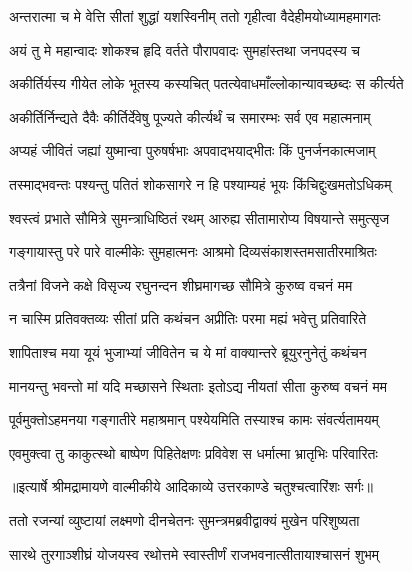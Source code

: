 \twolineshloka
{अन्तरात्मा च मे वेत्ति सीतां शुद्धां यशस्विनीम्}
{ततो गृहीत्वा वैदेहीमयोध्यामहमागतः} %

\twolineshloka
{अयं तु मे महान्वादः शोकश्च हृदि वर्तते}
{पौरापवादः सुमहांस्तथा जनपदस्य च} %

\twolineshloka
{अकीर्तिर्यस्य गीयेत लोके भूतस्य कस्यचित्}
{पतत्येवाधमाँल्लोकान्यावच्छब्दः स कीर्त्यते} %

\twolineshloka
{अकीर्तिर्निन्द्यते दैवैः कीर्तिर्देवेषु पूज्यते}
{कीर्त्यर्थं च समारम्भः सर्व एव महात्मनाम्} %

\twolineshloka
{अप्यहं जीवितं जह्यां युष्मान्वा पुरुषर्षभाः}
{अपवादभयाद्भीतः किं पुनर्जनकात्मजाम्} %

\twolineshloka
{तस्माद्भवन्तः पश्यन्तु पतितं शोकसागरे}
{न हि पश्याम्यहं भूयः किंचिद्दुःखमतोऽधिकम्} %

\twolineshloka
{श्वस्त्वं प्रभाते सौमित्रे सुमन्त्राधिष्ठितं रथम्}
{आरुह्य सीतामारोप्य विषयान्ते समुत्सृज} %

\twolineshloka
{गङ्गायास्तु परे पारे वाल्मीकेः सुमहात्मनः}
{आश्रमो दिव्यसंकाशस्तमसातीरमाश्रितः} %

\twolineshloka
{तत्रैनां विजने कक्षे विसृज्य रघुनन्दन}
{शीघ्रमागच्छ सौमित्रे कुरुष्व वचनं मम} %

\twolineshloka
{न चास्मि प्रतिवक्तव्यः सीतां प्रति कथंचन}
{अप्रीतिः परमा मह्यं भवेत्तु प्रतिवारिते} %

\twolineshloka
{शापिताश्च मया यूयं भुजाभ्यां जीवितेन च}
{ये मां वाक्यान्तरे ब्रूयुरनुनेतुं कथंचन} %

\twolineshloka
{मानयन्तु भवन्तो मां यदि मच्छासने स्थिताः}
{इतोऽद्य नीयतां सीता कुरुष्व वचनं मम} %

\twolineshloka
{पूर्वमुक्तोऽहमनया गङ्गातीरे महाश्रमान्}
{पश्येयमिति तस्याश्च कामः संवर्त्यतामयम्} %

\twolineshloka
{एवमुक्त्वा तु काकुत्स्थो बाष्पेण पिहितेक्षणः}
{प्रविवेश स धर्मात्मा भ्रातृभिः परिवारितः} %


{॥इत्यार्षे श्रीमद्रामायणे वाल्मीकीये आदिकाव्ये उत्तरकाण्डे चतुश्चत्वारिंशः सर्गः॥}


\twolineshloka
{ततो रजन्यां व्युष्टायां लक्ष्मणो दीनचेतनः}
{सुमन्त्रमब्रवीद्वाक्यं मुखेन परिशुष्यता} %

\twolineshloka
{सारथे तुरगाञ्शीघ्रं योजयस्व रथोत्तमे}
{स्वास्तीर्णं राजभवनात्सीतायाश्चासनं शुभम्} %

